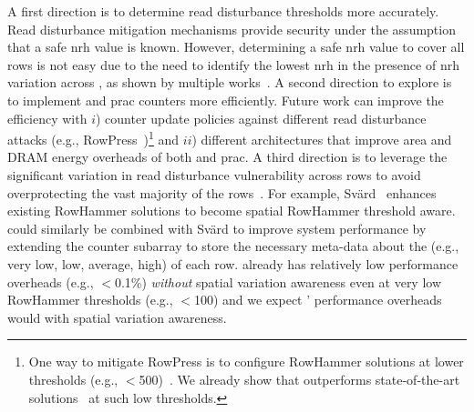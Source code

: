 A first direction is to determine read disturbance thresholds more accurately.
Read disturbance mitigation mechanisms provide security under the assumption that a safe \gls{nrh} value is known.
However, determining a safe \gls{nrh} value to cover all rows is not easy due to the need to identify the lowest \gls{nrh} in the presence of \gls{nrh} variation across , as shown by multiple works~\cite{kim2014flipping, orosa2021deeper, luo2023rowpress, kim2020revisiting, saroiu2022configure, olgun2023understanding, zhou2023threshold, olgun2025variable, tugrul2025understanding, luo2024experimental, orosa2022spyhammer, yaglikci2022understanding}.
A second direction to explore is to implement \X{} and \gls{prac} counters more efficiently.
Future work can improve the efficiency with
$i$) counter update policies against different read disturbance attacks (e.g., RowPress~\cite{luo2023rowpress})\footnote{One way to mitigate RowPress is to configure RowHammer solutions at lower thresholds (e.g., $<$500)~\cite{luo2023rowpress}. We already show that \X{} outperforms state-of-the-art  solutions~\cite{park2020graphene,qureshi2022hydra,kim2014flipping,jedec2024jesd795c} at such low thresholds.} and
$ii$) different architectures that improve area and DRAM energy overheads of both \X{} and \gls{prac}.
A third direction is to leverage the significant variation in read disturbance vulnerability across rows to avoid overprotecting the vast majority of the rows~\cite{yaglikci2024spatial,orosa2021deeper}.
For example, Svärd~\cite{yaglikci2024spatial} enhances existing RowHammer solutions to become spatial RowHammer threshold aware.
\X{} could similarly be combined with Svärd to improve system performance by extending the counter subarray to store the necessary meta-data about the  (e.g., very low, low, average, high) of each row.
\X{} already has relatively low performance overheads (e.g., $<$0.1\%) \emph{without} spatial variation awareness even at very low RowHammer thresholds (e.g., $<$100) and we expect \X{}’ performance overheads would  with spatial variation awareness.

